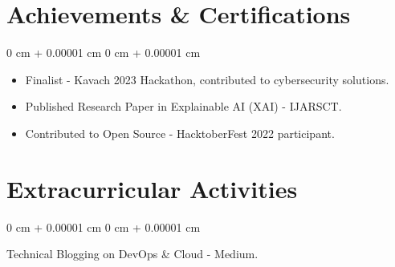 \documentclass[10pt, letterpaper]{article}
\newenvironment{highlightsforbulletentries}{
    \begin{itemize}[
        topsep=0.10 cm,
        parsep=0.10 cm,
        partopsep=0pt,
        itemsep=0pt,
        leftmargin=10pt
    ]
}{
    \end{itemize}
} %
\newenvironment{onecolentry}{
    \begin{adjustwidth}{
        0 cm + 0.00001 cm
    }{
        0 cm + 0.00001 cm
    }
}{
    \end{adjustwidth}
} %
\begin{document}
    \section{Achievements \& Certifications}

        \begin{onecolentry}
            \begin{highlightsforbulletentries}
                \item Finalist - Kavach 2023 Hackathon, contributed to cybersecurity solutions.
                \item Published Research Paper in Explainable AI (XAI) - IJARSCT.
                \item Contributed to Open Source - HacktoberFest 2022 participant.
            \end{highlightsforbulletentries}
        \end{onecolentry}

    \section{Extracurricular Activities}

        \begin{onecolentry}
            Technical Blogging on DevOps \& Cloud - Medium.
        \end{onecolentry}
\end{document}
